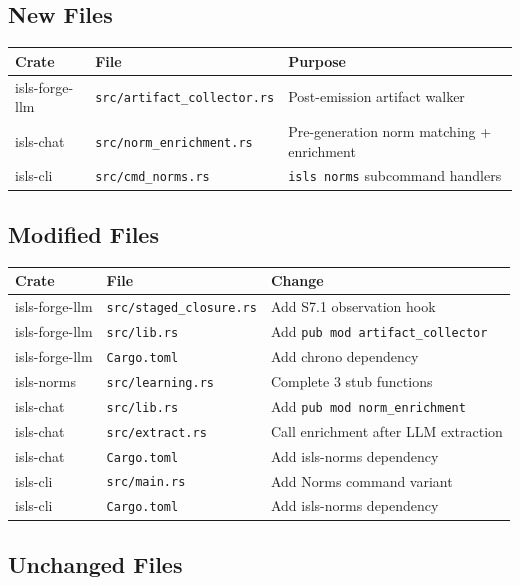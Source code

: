 \documentclass[11pt,a4paper]{article}
\begin{document}
\subsection{New Files}

\begin{longtable}{llp{7cm}}
\toprule
\textbf{Crate} & \textbf{File} & \textbf{Purpose} \\
\midrule
isls-forge-llm & \texttt{src/artifact\_collector.rs} 
  & Post-emission artifact walker \\
isls-chat & \texttt{src/norm\_enrichment.rs} 
  & Pre-generation norm matching + enrichment \\
isls-cli & \texttt{src/cmd\_norms.rs} 
  & \texttt{isls norms} subcommand handlers \\
\bottomrule
\end{longtable}

\subsection{Modified Files}

\begin{longtable}{llp{7cm}}
\toprule
\textbf{Crate} & \textbf{File} & \textbf{Change} \\
\midrule
isls-forge-llm & \texttt{src/staged\_closure.rs} 
  & Add S7.1 observation hook \\
isls-forge-llm & \texttt{src/lib.rs} 
  & Add \texttt{pub mod artifact\_collector} \\
isls-forge-llm & \texttt{Cargo.toml} 
  & Add chrono dependency \\
isls-norms & \texttt{src/learning.rs} 
  & Complete 3 stub functions \\
isls-chat & \texttt{src/lib.rs} 
  & Add \texttt{pub mod norm\_enrichment} \\
isls-chat & \texttt{src/extract.rs} 
  & Call enrichment after LLM extraction \\
isls-chat & \texttt{Cargo.toml} 
  & Add isls-norms dependency \\
isls-cli & \texttt{src/main.rs} 
  & Add Norms command variant \\
isls-cli & \texttt{Cargo.toml} 
  & Add isls-norms dependency \\
\bottomrule
\end{longtable}

\subsection{Unchanged Files}
\end{document}
